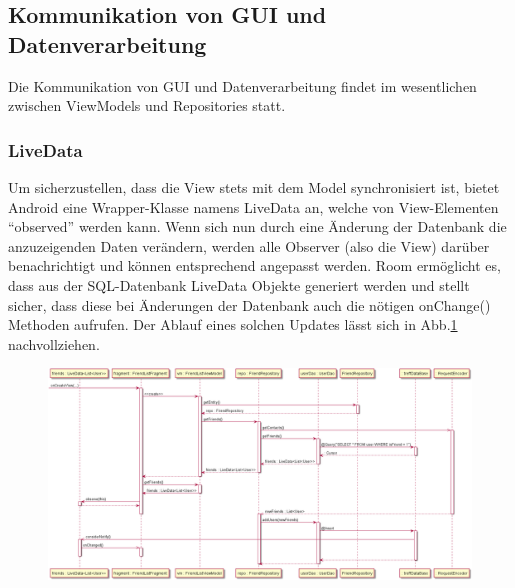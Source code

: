 \documentclass[parskip=full,11pt]{scrartcl}
\begin{document}
\subsection{Kommunikation von GUI und Datenverarbeitung}
Die Kommunikation von GUI und Datenverarbeitung findet im wesentlichen zwischen
ViewModels und Repositories statt.

\subsubsection{LiveData} \label{sec:livedata}
Um sicherzustellen, dass die View stets mit dem Model synchronisiert ist,
bietet Android eine Wrapper-Klasse namens LiveData an, welche von View-Elementen
\enquote{observed} werden kann. Wenn sich nun durch eine Änderung der Datenbank
die anzuzeigenden Daten verändern, werden alle Observer (also die View) darüber
benachrichtigt und können entsprechend angepasst werden.
Room ermöglicht es, dass aus der SQL-Datenbank LiveData Objekte generiert
werden und stellt sicher, dass diese bei Änderungen der Datenbank auch die
nötigen onChange() Methoden aufrufen. Der Ablauf eines solchen Updates lässt
sich in Abb.\ref{fig:datafetch} nachvollziehen.

\begin{figure}
	\centering
	\includegraphics[width = \paperheight / 3 * 2, angle = -90]{datafetch.png}
	\label{fig:datafetch}
\end{figure}
\end{document}
